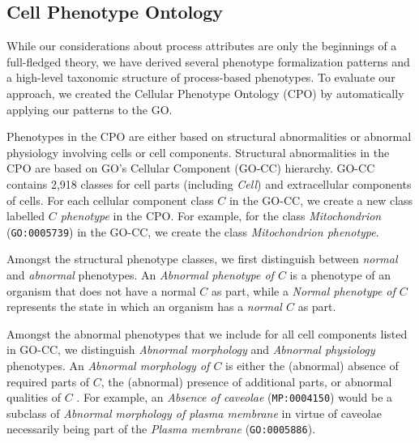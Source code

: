\documentclass{bioinfo}
\renewcommand{\cite}{\citep}
\begin{document}




\subsection{Cell Phenotype Ontology}
While our considerations about process attributes are only the
beginnings of a full-fledged theory, we have derived several phenotype
formalization patterns and a high-level taxonomic structure of
process-based phenotypes. To evaluate our approach, we created the
Cellular Phenotype Ontology (CPO) by automatically applying our
patterns to the GO.

Phenotypes in the CPO are either based on structural abnormalities or
abnormal physiology involving cells or cell components. Structural
abnormalities in the CPO are based on GO's Cellular Component (GO-CC)
hierarchy. GO-CC contains 2,918 classes for cell parts (including {\em
  Cell}) and extracellular components of cells. For each cellular
component class $C$ in the GO-CC, we create a new class labelled {\em
  $C$ phenotype} in the CPO. For example, for the class {\em
  Mitochondrion} ({\tt GO:0005739}) in the GO-CC, we create the class
{\em Mitochondrion phenotype}.

Amongst the structural phenotype classes, we first distinguish between
{\em normal} and {\em abnormal} phenotypes. An {\em Abnormal phenotype
  of $C$} is a phenotype of an organism that does not have a normal
$C$ as part, while a {\em Normal phenotype of $C$} represents the
state in which an organism has a {\em normal $C$} as part.

Amongst the abnormal phenotypes that we include for all cell
components listed in GO-CC, we distinguish {\em Abnormal morphology}
and {\em Abnormal physiology} phenotypes. An {\em Abnormal morphology
  of $C$} is either the (abnormal) absence of required parts of $C$,
the (abnormal) presence of additional parts, or abnormal qualities of
$C$ \cite{Hoehndorf2010phene}. For example, an {\em Absence of
  caveolae} ({\tt MP:0004150}) would be a subclass of {\em Abnormal
  morphology of plasma membrane} in virtue of caveolae necessarily
being part of the {\em Plasma membrane} ({\tt GO:0005886}).
\end{document}
